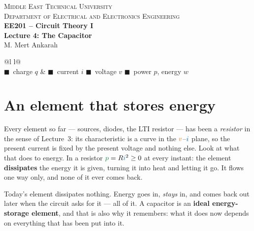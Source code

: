 \documentclass[11pt,a4paper]{article}
\newcommand{\Icol}[1]{\textcolor{ccur}{#1}}
\newcommand{\Vcol}[1]{\textcolor{cvolt}{#1}}
\newcommand{\Pcol}[1]{\textcolor{cpow}{#1}}
\newcommand{\Qcol}[1]{\textcolor{ccharge}{#1}}
\begin{document}
\begin{center}
\begin{tcolorbox}[enhanced, colback=metured!5, colframe=metured, boxrule=1pt,
                  arc=3pt, left=10pt,right=10pt,top=7pt,bottom=7pt, width=\textwidth]
\begin{center}
  {\small\scshape Middle East Technical University}\\[2pt]
  {\small\scshape Department of Electrical and Electronics Engineering}\\[7pt]
  {\Large\bfseries\color{metured} EE201 -- Circuit Theory I}\\[4pt]
  {\large\bfseries Lecture 4: The Capacitor}\\[6pt]
  {\small M. Mert Ankaralı}
\end{center}
\end{tcolorbox}
\end{center}
\vspace{-0.5em}

\begin{center}
\small
\begin{tabular}{@{}l l@{}}
\toprule
{}\\
\midrule
\Qcol{$\blacksquare$}~charge $q$ & \Icol{$\blacksquare$}~current $i$ \quad
\Vcol{$\blacksquare$}~voltage $v$ \quad \Pcol{$\blacksquare$}~power $p$, energy $w$\\
\bottomrule
\end{tabular}
\end{center}

\section{An element that stores energy}

Every element so far --- sources, diodes, the LTI resistor --- has been a \emph{resistor}
in the sense of Lecture~3: its characteristic is a curve in the $\Vcol{v}$--$\Icol{i}$
plane, so the present current is fixed by the present voltage and nothing else. Look at
what that does to energy. In a resistor $\Pcol{p} = R\Icol{i}^2 \ge 0$ at every instant:
the element \textbf{dissipates} the energy it is given, turning it into heat and letting
it go. It flows one way only, and none of it ever comes back.

Today's element dissipates nothing. Energy goes in, \emph{stays} in, and comes back out
later when the circuit asks for it --- all of it. A capacitor is an \textbf{ideal
energy-storage element}, and that is also why it remembers: what it does now depends on
everything that has been put into it.
\end{document}
